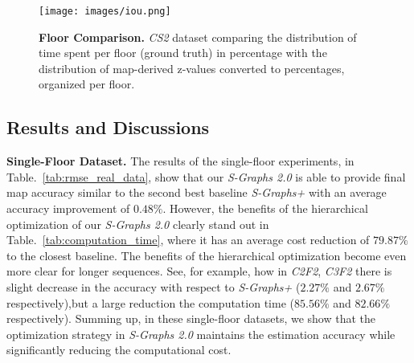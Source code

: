 \begin{figure}[t]
  \centering
  \texttt{[image: images/iou.png]}
  \caption{\textbf{Floor Comparison.} \textit{CS2} dataset comparing the distribution of time spent per floor (ground truth) in percentage with the distribution of map-derived z-values converted to percentages, organized per floor.}
  \label{fig:iou}
\end{figure}


\subsection{Results and Discussions}

\textbf{Single-Floor Dataset.}
The results of the single-floor experiments, in Table.~\ref{tab:rmse_real_data}, show that our \textit{S-Graphs 2.0} is able to provide final map accuracy similar to the second best baseline \textit{S-Graphs+} with an average accuracy improvement of $0.48\%$. However, the benefits of the hierarchical optimization of our \textit{S-Graphs 2.0} clearly stand out in Table.~\ref{tab:computation_time}, where it has an average cost reduction of $79.87\%$ to the closest baseline. The benefits of the hierarchical optimization become even more clear for longer sequences. See, for example, how in \textit{C2F2}, \textit{C3F2} there is slight decrease in the accuracy with respect to \textit{S-Graphs+} ($2.27\%$ and $2.67\%$ respectively),but a large reduction the computation time ($85.56\%$ and $82.66\%$ respectively). Summing up, in these single-floor datasets, we show that the optimization strategy in \textit{S-Graphs 2.0} maintains the estimation accuracy while significantly reducing the computational cost. 


